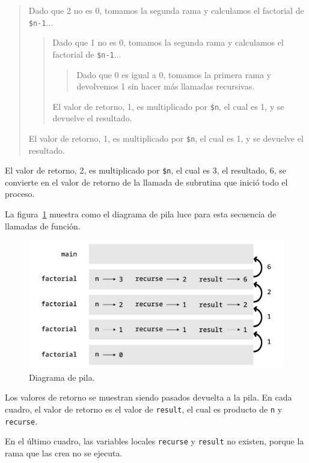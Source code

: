 \begin{quote}
Dado que 2 no es 0, tomamos la segunda rama y calculamos el factorial de
{\tt \$n-1}...


  \begin{quote}
  Dado que 1 no es 0, tomamos la segunda rama y calculamos el factorial de
  {\tt \$n-1}...


    \begin{quote}
    Dado que 0 es igual a 0, tomamos la primera rama y devolvemos 1
    sin hacer más llamadas recursivas.
    \end{quote}

	
  El valor de retorno, 1, es multiplicado por \verb|$n|, el cual es 1,
  y se devuelve el resultado.
  \end{quote}


El valor de retorno, 1, es multiplicado por \verb|$n|, el cual es 1,
y se devuelve el resultado.
\end{quote}


El valor de retorno, 2, es multiplicado por \verb|$n|, el cual es 3,
el resultado, 6, se convierte en el valor de retorno de la llamada
de subrutina que inició todo el proceso.

La figura~\ref{fig.stack3} muestra como el diagrama de pila luce para esta
secuencia de llamadas de función.

\begin{figure}
\centerline
{\includegraphics[scale=0.7]{figs/stack3.pdf}}
\caption{Diagrama de pila.}
\label{fig.stack3}
\end{figure}

Los valores de retorno se muestran siendo pasados devuelta a la pila. En cada
cuadro, el valor de retorno es el valor de {\tt result}, el cual es 
producto de {\tt n} y {\tt recurse}.

En el último cuadro, las variables locales {\tt recurse} y {\tt result}
no existen, porque la rama que las crea no se ejecuta.

